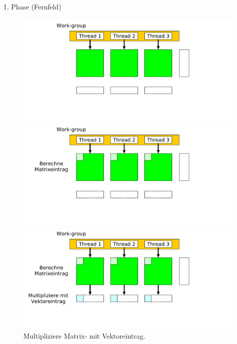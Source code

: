 \documentclass[10pt]{beamer}
\begin{document}
\begin{frame}{1. Phase (Fernfeld)}
  \begin{figure}
    \begin{overprint}
        \centering
        \includegraphics[width=\linewidth]{figures/fg-ff-initial-situation.pdf}
        \caption{Ausgangssituation einer OpenCL-Work-Group in der 1. Phase.}
        \centering
        \includegraphics[width=\linewidth]{figures/fg-ff-compute-matrix-entry.pdf}
        \caption{Berechne den ersten Eintrag einer Matrixzeile.}
        \centering
        \includegraphics[width=\linewidth]{figures/fg-ff-multiply-vector.pdf}
        \caption{Multipliziere Matrix- mit Vektoreintrag.}

\end{overprint}
\end{figure}
\end{frame}
\end{document}
